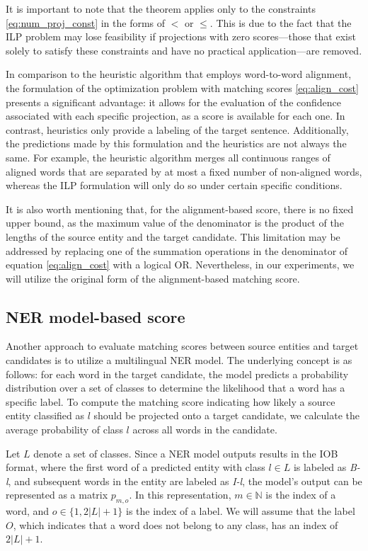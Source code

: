 It is important to note that the theorem applies only to the constraints
\eqref{eq:num_proj_const} in the forms of \( < \) or \( \leq \). This is due to
the fact that the ILP problem may lose feasibility if projections with zero
scores—those that exist solely to satisfy these constraints and have no practical
application—are removed.

In comparison to the heuristic algorithm that employs word-to-word alignment,
the formulation of the optimization problem with matching scores \eqref{eq:align_cost}
presents a significant advantage: it allows for the evaluation of the confidence
associated with each specific projection, as a score is available for each one.
In contrast, heuristics only provide a labeling of the target sentence. Additionally,
the predictions made by this formulation and the heuristics are not always the same.
For example, the heuristic algorithm merges all continuous ranges of aligned words
that are separated by at most a fixed number of non-aligned words, whereas the
ILP formulation will only do so under certain specific conditions.

It is also worth mentioning that, for the alignment-based score, there is no fixed
upper bound, as the maximum value of the denominator is the product of the lengths of
the source entity and the target candidate. This limitation may be addressed by
replacing one of the summation operations in the denominator of equation
\eqref{eq:align_cost} with a logical OR. Nevertheless, in our experiments, we will
utilize the original form of the alignment-based matching score.

\subsection{NER model-based score}

Another approach to evaluate matching scores between source entities
and target candidates is to utilize a multilingual NER model.
The underlying concept is as follows: for each word in the target
candidate, the model predicts a probability distribution over a
set of classes to determine the likelihood that a word has a
specific label. To compute the matching score indicating how likely a source
entity classified as \( l \) should be projected onto a target candidate,
we calculate the average probability of class \( l \) across all words in
the candidate.

Let \( L \) denote a set of classes. Since a NER model outputs results in the IOB format,
where the first word of a predicted entity with class \( l \in L \) is labeled as
\textit{B-l}, and subsequent words in the entity are labeled as \textit{I-l}, the
model's output can be represented as a matrix \( p_{m, o} \). In this representation,
\( m \in \mathbb{N} \) is the index of a word, and \( o \in \{ 1, 2|L| + 1 \} \) is the
index of a label. We will assume that the label \( O \), which indicates that a word does not
belong to any class, has an index of \( 2|L| + 1 \).

